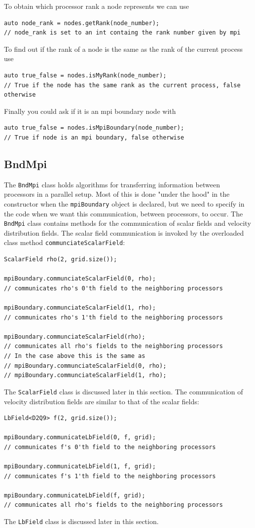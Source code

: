 \documentclass[11pt,a4paper]{report}
\begin{document}
To obtain which processor rank a node represents we can use 
\begin{verbatim}
auto node_rank = nodes.getRank(node_number);
// node_rank is set to an int containg the rank number given by mpi
\end{verbatim}
To find out if the rank of a node is the same as the rank of the current process use 
\begin{verbatim}
auto true_false = nodes.isMyRank(node_number);
// True if the node has the same rank as the current process, false otherwise
\end{verbatim}
Finally you could ask if it is an mpi boundary node with 
\begin{verbatim}
auto true_false = nodes.isMpiBoundary(node_number);
// True if node is an mpi boundary, false otherwise
\end{verbatim}

\subsection{BndMpi}
\label{sec:bndmpi}
The \texttt{BndMpi} class holds algorithms for transferring information between processors in a parallel setup. Most of this is done "under the 
hood" in the constructor when the \texttt{mpiBoundary} object is declared, but we need to specify in the code when we want this communication, between processors, to occur. The \texttt{BndMpi} class contains methods for the communication of scalar fields and velocity distribution fields. The scalar field communication is invoked by the overloaded class method \texttt{communciateScalarField}: 
\begin{verbatim}
ScalarField rho(2, grid.size());

mpiBoundary.communciateScalarField(0, rho);
// communicates rho's 0'th field to the neighboring processors

mpiBoundary.communciateScalarField(1, rho);
// communicates rho's 1'th field to the neighboring processors

mpiBoundary.communciateScalarField(rho);
// communicates all rho's fields to the neighboring processors
// In the case above this is the same as
// mpiBoundary.communciateScalarField(0, rho);
// mpiBoundary.communciateScalarField(1, rho);
\end{verbatim}
The \texttt{ScalarField} class is discussed later in this section. The communication of velocity distribution fields are similar to that of the scalar fields:
\begin{verbatim}
LbField<D2Q9> f(2, grid.size());

mpiBoundary.communicateLbField(0, f, grid);
// communicates f's 0'th field to the neighboring processors

mpiBoundary.communicateLbField(1, f, grid);
// communicates f's 1'th field to the neighboring processors

mpiBoundary.communicateLbField(f, grid);
// communicates all rho's fields to the neighboring processors
\end{verbatim}
The \texttt{LbField} class is discussed later in this section.
\end{document}
